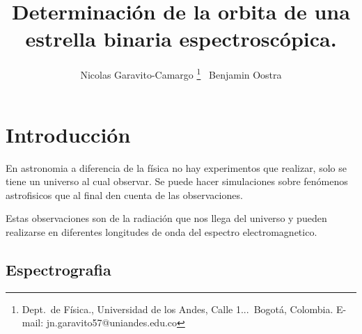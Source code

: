 \documentclass[Proceedings]{ascelike}
\begin{document}
%
\title{Determinaci\'on de la orbita de una estrella binaria espectrosc\'opica.}
%
\author{
Nicolas Garavito-Camargo%
%
\thanks{
Dept.\ de F\'isica.,
Universidad de los Andes, 
Calle 1...\ Bogot\'a, Colombia. E-mail: jn.garavito57@uniandes.edu.co}
\ Benjamin Oostra\footnotemark[1]
%
%
%
%
%
%
}
%
\maketitle
%
\begin{abstract}

\end{abstract}


%
%
%
\section{Introducci\'on}

En astronomia a diferencia de la f\'isica no hay experimentos que realizar,
solo se tiene un universo al cual observar. Se puede hacer simulaciones sobre 
fen\'omenos astrofisicos que al final den cuenta de las observaciones.

Estas observaciones son de la radiaci\'on que nos llega del universo y pueden 
realizarse en diferentes longitudes de onda del espectro electromagnetico.  

\subsection{Espectrografia}
\end{document}
